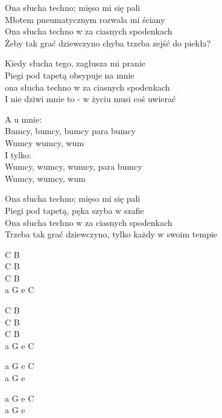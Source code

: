 \begin{text}
    Ona słucha techno; mięso mi się pali\\
    Młotem pneumatycznym rozwala mi ściany\\
    Ona słucha techno w za ciasnych spodenkach\\
    Żeby tak grać dziewczyno chyba trzeba zejść do piekła?

    Kiedy słucha tego, zagłusza mi pranie\\
    Piegi pod tapetą obsypuje na mnie\\
    ona słucha techno w za ciasnych spodenkach\\
    I nie dziwi mnie to - w życiu musi coś uwierać

    \vin A u mnie:\\
    \vin Bumcy, bumcy, bumcy para bumcy\\
    \vin Wumcy wumcy, wum\\
    \vin I tylko:\\
    \vin Wumcy, wumcy, wumcy, para bumcy\\
    \vin Wumcy, wumcy, wum

    Ona słucha techno; mięso mi się pali\\
    Piegi pod tapetą, pęka szyba w szafie\\
    Ona słucha techno w za ciasnych spodenkach\\
    Trzeba tak grać dziewczyno, tylko każdy w swoim tempie
\end{text}
\begin{chord}
    C B\\
    C B\\
    C B\\
    a G e C

    C B\\
    C B\\
    C B\\
    a G e C

    \hfill\break
    a G e C\\
    a G e

    a G e C\\
    a G e
\end{chord}